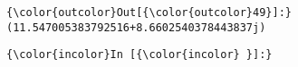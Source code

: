 \documentclass[11pt]{article}
\begin{document}
\begin{Verbatim}[commandchars=\\\{\}]
{\color{outcolor}Out[{\color{outcolor}49}]:} (11.547005383792516+8.6602540378443837j)
\end{Verbatim}
            
    \begin{Verbatim}[commandchars=\\\{\}]
{\color{incolor}In [{\color{incolor} }]:} 
\end{Verbatim}



    
    
    
    
\end{document}
